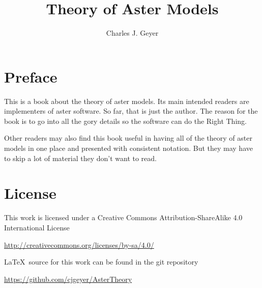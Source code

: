 \documentclass[11pt,oneside]{book}
\begin{document}
\title{Theory of Aster Models}

\author{Charles J. Geyer}

\maketitle

\frontmatter

\chapter{Preface}

This is a book about the theory of aster models.  Its main intended
readers are implementers of aster software.  So far, that is just the
author.  The reason for the book is to go into all the gory details
so the software can do the Right Thing.

Other readers may also find this book useful in having all of the theory
of aster models in one place and presented with consistent notation.
But they may have to skip a lot of material they don't want to read.

\chapter{License}

This work is licensed under a Creative Commons Attribution-ShareAlike 4.0
International License
\begin{trivlist}
\item
\url{http://creativecommons.org/licenses/by-sa/4.0/}
\end{trivlist}

\LaTeX\ source for this work can be found in the git repository
\begin{trivlist}
\item
\url{https://github.com/cjgeyer/AsterTheory}
\end{trivlist}

\tableofcontents

\mainmatter







\appendix













\printindex
\end{document}
